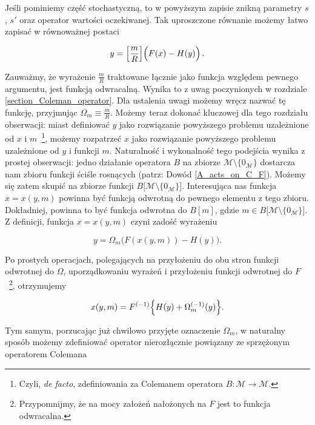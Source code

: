 Jeśli pominiemy część stochastyczną, to w powyższym zapisie znikną parametry $s$, $s'$ oraz operator wartości oczekiwanej. Tak uproszczone równanie możemy łatwo zapisać w równoważnej postaci 

\begin{equation*}
y= \Bigl [\frac{m}{R}\Bigl] \Big ( F(x) - H(y) \Big) \,.
\end{equation*}


Zauważmy, że wyrażenie $\frac{m}{R}$ traktowane łącznie jako funkcja względem pewnego argumentu, jest funkcją odwracalną. Wynika to z uwag poczynionych w rozdziale \ref{section_Coleman_operator}. Dla ustalenia uwagi możemy wręcz nazwać tę funkcję, przyjmując $\Omega_m \equiv \frac{m}{R}$. Możemy teraz dokonać kluczowej dla tego rozdziału obserwacji: miast definiować $y$ jako rozwiązanie powyższego problemu uzależnione od $x$ i $m$~\footnote{Czyli, {\it de facto}, zdefiniowania za Colemanem operatora $B: \mathcal{M}\rightarrow\mathcal{M}$.}, możemy rozpatrzeć $x$ jako rozwiązanie powyższego problemu uzależnione od $y$ i funkcji $m$. Naturalność i wykonalność tego podejścia wynika z prostej obserwacji: jedno działanie operatora $B$ na zbiorze $\mathcal{M} \setminus \{0_{\mathcal{M}}\}$ dostarcza nam zbioru funkcji ściśle rosnących (patrz: Dowód \ref{A_acts_on_C_F}). Możemy się zatem skupić na zbiorze funkcji $B\big[ \mathcal{M} \setminus \{0_{\mathcal{M}}\}\big]$. Interesująca nas funkcja $x = x(y,m)$ powinna być funkcją odwrotną do pewnego elementu z tego zbioru. Dokładniej, powinna to być funkcja odwrotna do $B[m]$, gdzie $m\in B\big[ \mathcal{M} \setminus \{0_{\mathcal{M}}\}\big]$. Z definicji, funkcja $x = x(y,m)$ czyni zadość wyrażeniu

\begin{equation*}
y= \Omega_m \Big ( F(x(y,m)) - H(y) \Big). 
\end{equation*}

Po prostych operacjach, polegających na przyłożeniu do obu stron funkcji odwrotnej do $\Omega$, uporządkowaniu wyrażeń i przyłożeniu funkcji odwrotnej do $F$~\footnote{Przypomnijmy, że na mocy założeń nałożonych na $F$ jest to funkcja odwracalna.}, otrzymujemy

\begin{equation*}
x(y,m) = F^{(-1)} \Bigl \{ H(y) + \Omega_m^{(-1)}(y) \Bigl \}.
\end{equation*} 

Tym samym, porzucając już chwilowo przyjęte oznaczenie $\Omega_m$, w naturalny sposób możemy zdefiniować operator nierozłącznie powiązany ze sprzężonym operatorem Colemana

